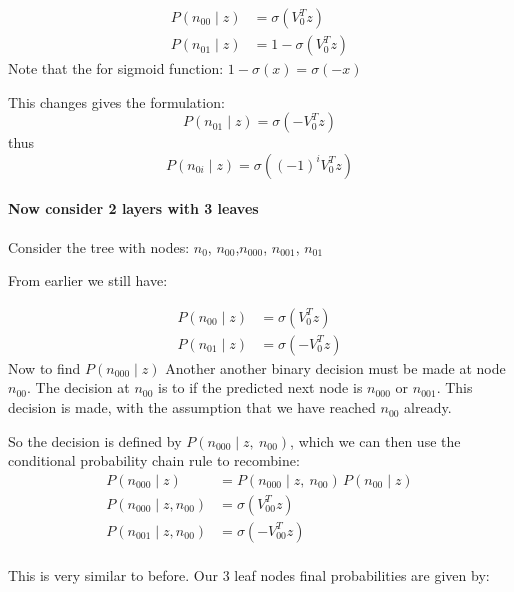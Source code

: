\documentclass[parskip]{komatufte}
\begin{document}
\begin{align}
P(n_{00}\mid z) &=\sigma(V_{0}^{T}z) \\
P(n_{01}\mid z) &=1-\sigma(V_{0}^{T}z)
\end{align}
Note that the for sigmoid function: $1-\sigma(x)=\sigma(-x)$

This changes gives the formulation:
\begin{equation}
P(n_{01}\mid z)=\sigma({-}V_{0}^{T}z)
\end{equation}
thus
\begin{equation}
P(n_{0i}\mid z)=\sigma(({-}1)^i V_{0}^{T}z)
\end{equation}


\paragraph{Now consider 2 layers with 3 leaves}

Consider the tree with nodes: $n_{0}$, $n_{00}$,$n_{000}$, $n_{001}$, $n_{01}$


From earlier we still have:

\begin{align}
P(n_{00}\mid z)&=\sigma(V_{0}^{T}z)\\
P(n_{01}\mid z)&=\sigma(-V_{0}^{T}z)
\end{align}
Now to find $P(n_{000}\mid z)$
Another another binary decision must be made at node $n_{00}$.
The decision at $n_{00}$ is to if the predicted next node is $n_{000}$ or $n_{001}$.
This decision is made, with the assumption that we have reached $n_{00}$ already.

So the decision is defined by $P(n_{000}\mid z,\:n_{00})$,
which we can then use the conditional probability chain rule to recombine:
\begin{align}
P(n_{000}\mid z)&=P(n_{000}\mid z,\:n_{00})\,P(n_{00}\mid z) \\
P(n_{000}\mid z,n_{00})&=\sigma(V_{00}^{T}z) \\
P(n_{001}\mid z,n_{00})&=\sigma(-V_{00}^{T}z) \\
\end{align}

This is very similar to before.
Our 3 leaf nodes final probabilities are given by:
\end{document}
